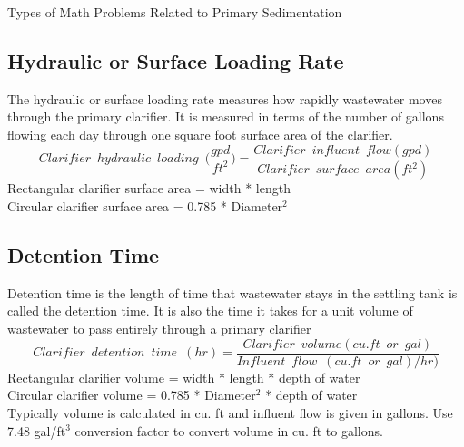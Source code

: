 Types of Math Problems Related to Primary Sedimentation 


\subsection{Hydraulic or Surface Loading Rate}

The hydraulic or surface loading rate measures how rapidly wastewater moves through the primary clarifier.  It is measured in terms of the number of gallons flowing each day through one square foot surface area of the clarifier. 
$$Clarifier \enspace hydraulic \enspace loading \enspace 	\Big(\dfrac{gpd}{ft^2}\Big) =\dfrac{Clarifier \enspace influent 	\enspace flow (gpd)}{Clarifier \enspace surface \enspace area 	(ft^2)}$$ 
		Rectangular clarifier surface area  = width * length\\
		Circular clarifier surface area  = 0.785 * Diameter$^2 $\\
\subsection{Detention Time}

Detention time is the length of time that wastewater stays in the settling tank is called the detention time.  It is also the time it takes for a unit volume of wastewater to pass entirely through a primary clarifier\\
$$Clarifier \enspace detention \enspace time \enspace (hr) = 	\dfrac{ Clarifier \enspace volume (cu.ft \enspace or \enspace gal)}{Influent \enspace flow \enspace (cu.ft \enspace or \enspace gal)/hr)}$$
Rectangular clarifier volume = width * length * depth of water\\
Circular clarifier volume = 0.785 * Diameter$^2$ * depth of water\\
Typically volume is calculated in cu. ft and influent flow is given in gallons.  Use 7.48 gal/ft$^3$ conversion factor to convert volume in cu. ft to gallons.\\

